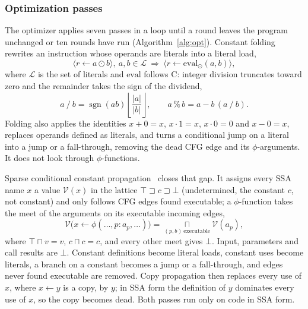 \documentclass{ieeeaccess}
\begin{document}
\subsubsection{Optimization passes}
The optimizer applies seven passes in a loop until a round leaves the program unchanged or ten rounds have run (Algorithm~\ref{alg:opt}). Constant folding rewrites an instruction whose operands are literals into a literal load,
\begin{equation}
\langle r\gets a\odot b\rangle,\ a,b\in\mathcal{L}\ \Longrightarrow\ \langle r\gets \mathrm{eval}_\odot(a,b)\rangle,
\label{eq:fold}
\end{equation}
where $\mathcal{L}$ is the set of literals and $\mathrm{eval}$ follows C: integer division truncates toward zero and the remainder takes the sign of the dividend,
\begin{equation}
a \mathbin{/} b = \operatorname{sgn}(ab)\left\lfloor \frac{|a|}{|b|}\right\rfloor,\qquad a \mathbin{\%} b = a - b\,(a \mathbin{/} b).
\label{eq:cdiv}
\end{equation}
Folding also applies the identities $x+0=x$, $x\cdot1=x$, $x\cdot0=0$ and $x-0=x$, replaces operands defined as literals, and turns a conditional jump on a literal into a jump or a fall-through, removing the dead CFG edge and its $\phi$-arguments. It does not look through $\phi$-functions.

Sparse conditional constant propagation~\cite{wegman1991sccp} closes that gap. It assigns every SSA name $x$ a value $\mathcal{V}(x)$ in the lattice $\top \sqsupset c \sqsupset \bot$ (undetermined, the constant $c$, not constant) and only follows CFG edges found executable; a $\phi$-function takes the meet of the arguments on its executable incoming edges,
\begin{equation}
\mathcal{V}\big(x\gets\phi(\dots,p\!:\!a_p,\dots)\big)=\mathop{\sqcap}\limits_{(p,b)\ \mathrm{executable}}\mathcal{V}(a_p),
\label{eq:sccp}
\end{equation}
where $\top\sqcap v=v$, $c\sqcap c=c$, and every other meet gives $\bot$. Input, parameters and call results are $\bot$. Constant definitions become literal loads, constant uses become literals, a branch on a constant becomes a jump or a fall-through, and edges never found executable are removed. Copy propagation then replaces every use of $x$, where $x\gets y$ is a copy, by $y$; in SSA form the definition of $y$ dominates every use of $x$, so the copy becomes dead. Both passes run only on code in SSA form.
\end{document}
